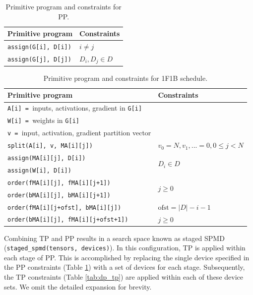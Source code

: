 \begin{table}[h]
\centering
\footnotesize
\begin{tabular}{l|l}
\textbf{Primitive program} & \textbf{Constraints} \\
\hline
\texttt{assign(G[i], D[i])} & $i \neq j$ \\
\texttt{assign(G[j], D[j])} & $D_i, D_j \in D$ \\
\hline
\end{tabular}
\caption{Primitive program and constraints for PP.}
\label{tab:pp}
\end{table}

\begin{table}[h]
\centering
\footnotesize
\begin{tabular}{l|l}
\textbf{Primitive program} & \textbf{Constraints} \\
\hline
\texttt{A[i] = }inputs, activations, gradient in \texttt{G[i]} & \\
\texttt{W[i] = }weights in \texttt{G[i]} & \\
\texttt{v = }input, activation, gradient partition vector & \\
\hline
\texttt{split(A[i], v, MA[i][j])} & $v_0 = N, v_1, ... = 0, 0 \leq j < N $ \\
\texttt{assign(MA[i][j], D[i])} & \multirow{2}{*}{$D_i \in D$} \\
\texttt{assign(W[i], D[i])} & \\
\hline
\texttt{order(fMA[i][j], fMA[i][j+1])} & \multirow{2}{*}{$j \geq 0$} \\ 
\texttt{order(bMA[i][j], bMA[i][j+1])} &   \\
\hline
\texttt{order(fMA[i][j+ofst], bMA[i][j])} &  $\mathrm{ofst} = |D| - i - 1$ \\
\texttt{order(bMA[i][j], fMA[i][j+ofst+1])} &  $j \geq 0$ \\
\hline
\end{tabular}
\caption{Primitive program and constraints for 1F1B schedule.}
\label{tab:1f1b}
\end{table}

Combining TP and PP results in a search space known as staged SPMD (\texttt{staged\_spmd(tensors, devices)}). In this configuration, TP is applied within each stage of PP. This is accomplished by replacing the single device specified in the PP constraints (Table \ref{tab:pp}) with a set of devices for each stage. Subsequently, the TP constraints (Table \ref{tab:dp_tp}) are applied within each of these device sets. We omit the detailed expansion for brevity.

